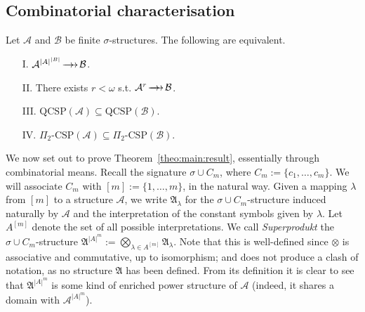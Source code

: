 \documentclass{LMCS}
\newcommand{\surhom}{
  \ensuremath{
      \negthinspace 
      \longrightarrow
      \hspace{-5mm} \rightarrow \hspace{1mm}
  }
}
\begin{document}
\subsection{Combinatorial characterisation}
\label{sec:comb}
\begin{thm}\label{theo:main:result}
  Let $\mathcal{A}$ and $\mathcal{B}$ be finite $\sigma$-structures. The following are equivalent.
  \begin{enumerate}[label=\Roman*.]
  \item[I.] $\mathcal{A}^{|A|^{|B|}} \surhom \mathcal{B}$.
  \item[II.] There exists $r<\omega$ s.t. $\mathcal{A}^r \surhom \mathcal{B}$.
  \item[III.] $\mathrm{QCSP}(\mathcal{A})  \subseteq \mathrm{QCSP}(\mathcal{B})$.
  \item[IV.] $\Pi_2\mbox{-}\mathrm{CSP}(\mathcal{A})  \subseteq \Pi_2\mbox{-}\mathrm{CSP}(\mathcal{B})$.
  \end{enumerate}
\end{thm}
\noindent We now set out to prove Theorem~\ref{theo:main:result}, essentially through combinatorial means. Recall the signature $\sigma \cup C_m$, where $C_m:=\{c_1,\ldots,c_m\}$. We will associate $C_m$ with $[m]:=\{1,\ldots,m\}$, in the natural way. Given a mapping $\lambda$ from $[m]$ to a structure $\mathcal{A}$, we
write $\mathfrak{A}_\lambda$ for the $\sigma \cup C_m$-structure induced naturally by $\mathcal{A}$ and the
interpretation of the constant symbols given by $\lambda$. Let $A^{[m]}$
denote the set of  all possible interpretations. We call \emph{Superprodukt} the $\sigma \cup C_m$-structure $\mathfrak{A}^{|A|^m}:=\bigotimes_{\lambda \in
  A^{[m]}} \mathfrak{A}_\lambda$. Note that this is well-defined since $\otimes$ is associative and commutative, up to isomorphism; and does not produce a clash of notation, as no structure $\mathfrak{A}$ has been defined. From its definition it is clear to see that $\mathfrak{A}^{|A|^m}$ is some kind of enriched power structure of $\mathcal{A}$ (indeed, it shares a  domain with $\mathcal{A}^{|A|^m}$).
\end{document}
